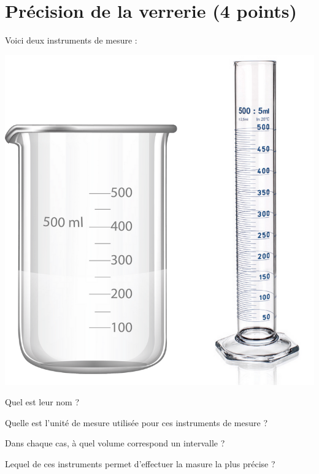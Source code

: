 \section{Précision de la verrerie (4 points)}

Voici deux instruments de mesure :

\begin{center}
	\includegraphics[scale=0.4]{img/vol}
\end{center}

\begin{questions}
	\question[1] Quel est leur nom ?

		\begin{solution}
			
		\end{solution}
	
	\question[1] Quelle est l'unité de mesure utilisée pour ces instruments de mesure ?

	\question[1] Dans chaque cas, à quel volume correspond un intervalle ?
	
	
	\question[1] Lequel de ces instruments permet d'effectuer la masure la plus précise ?
	

\end{questions}